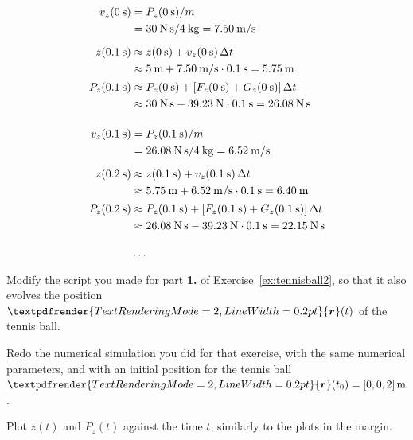 \documentclass[a4paper,12pt,%
onecolumn,oneside,%
british%
]{memoir}
\renewcommand*{\bm}[1]{\textpdfrender{TextRenderingMode=2,LineWidth=0.2pt}{\boldsymbol{#1}}}
\newcommand*{\incr}{\Delta}%
\renewcommand*{\|}[1][]{\nonscript\:#1\vert\nonscript\:\mathopen{}}
\newcommand*{\yr}{\bm{r}}
\newcommand*{\yti}{t_{0}}
\newcommand*{\Dt}{\incr t}
\newcommand*{\ym}{m}%
\begin{document}
\begin{equation*}
  \begin{aligned}
    v_{z}(\qty{0}{s}) &= P_{z}(\qty{0}{s})/\ym\\
    &=\qty{30}{N\,s}/\qty{4}{kg} = \qty{7.50}{m/s}
    \\[2\jot]
    z(\qty{0.1}{s})  &\approx z(\qty{0}{s}) + v_{z}(\qty{0}{s})\,\Dt\\
    &\approx \qty{5}{m} + \qty{7.50}{m/s}\cdot\qty{0.1}{s} = \qty{5.75}{m}
    \\[0.5\jot]
    P_{z}(\qty{0.1}{s})  &\approx P_{z}(\qty{0}{s}) + [F_{z}(\qty{0}{s}) + G_{z}(\qty{0}{s})]\,\Dt \\
    &\approx\qty{30}{N\,s} -\qty{39.23}{N}\cdot\qty{0.1}{s} = \qty{26.08}{N\,s}
    \\[4\jot]
    v_{z}(\qty{0.1}{s}) &= P_{z}(\qty{0.1}{s})/\ym\\
    &=\qty{26.08}{N\,s}/\qty{4}{kg} = \qty{6.52}{m/s}
    \\[2\jot]
    z(\qty{0.2}{s})  &\approx z(\qty{0.1}{s}) + v_{z}(\qty{0.1}{s})\,\Dt\\
    &\approx \qty{5.75}{m} + \qty{6.52}{m/s}\cdot\qty{0.1}{s} = \qty{6.40}{m}
    \\[0.5\jot]
    P_{z}(\qty{0.2}{s})  &\approx P_{z}(\qty{0.1}{s}) + [F_{z}(\qty{0.1}{s}) + G_{z}(\qty{0.1}{s})]\,\Dt\\
    &\approx\qty{26.08}{N\,s} -\qty{39.23}{N}\cdot\qty{0.1}{s} = \qty{22.15}{N\,s}
    \\[3\jot]
    &\dotso
  \end{aligned}
\end{equation*}

\begin{exercise}[label={ex:tennisball3}]
  Modify the script you made for part \textbf{1.} of Exercise~\ref{ex:tennisball2}, so that it also evolves the position $\yr(t)$ of the tennis ball.

  Redo the numerical simulation you did for that exercise, with the same numerical parameters, and with an initial position for the tennis ball $\yr(\yti) = [0,0,2]\,\unit{m}$.

  Plot $z(t)$ and $P_{z}(t)$ against the time $t$, similarly to the plots in the margin.
\end{exercise}
\end{document}
